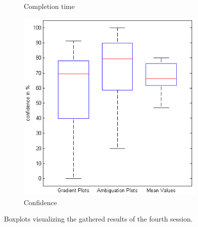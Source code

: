 \begin{figure}[H]
\begin{subfigure}[b]{0.32\textwidth}
        \caption{Completion time}
        \label{fig:s4_time}
    \end{subfigure}
		\begin{subfigure}[b]{0.32\textwidth}
        \includegraphics[width=\textwidth]{figures/boxplots/s4_confidence.png}
        \caption{Confidence}
        \label{fig:s4_confidence}
    \end{subfigure}
    \caption{Boxplots visualizing the gathered results of the fourth session.}
		\label{fig:s4_boxplots}
\end{figure}
